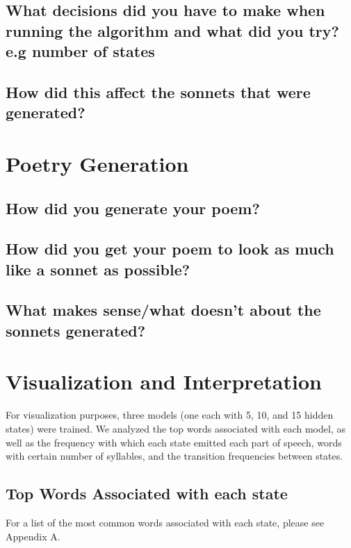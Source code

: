 \subsection{What decisions did you have to make when running the algorithm and what did you try? e.g number of states}
\subsection{How did this affect the sonnets that were generated?}

\section{Poetry Generation}
\medskip

\subsection{How did you generate your poem?}
\subsection{How did you get your poem to look as much like a sonnet as possible?}
\subsection{What makes sense/what doesn't about the sonnets generated?}


\section{Visualization and Interpretation}
For visualization purposes, three models (one each with 5, 10, and 15 hidden states) were trained. We analyzed the top words associated with each model, as well as the frequency with which each state emitted each part of speech, words with certain number of syllables, and the transition frequencies between states.

\medskip

\subsection{Top Words Associated with each state}
For a list of the most common words associated with each state, please see Appendix A.\\


